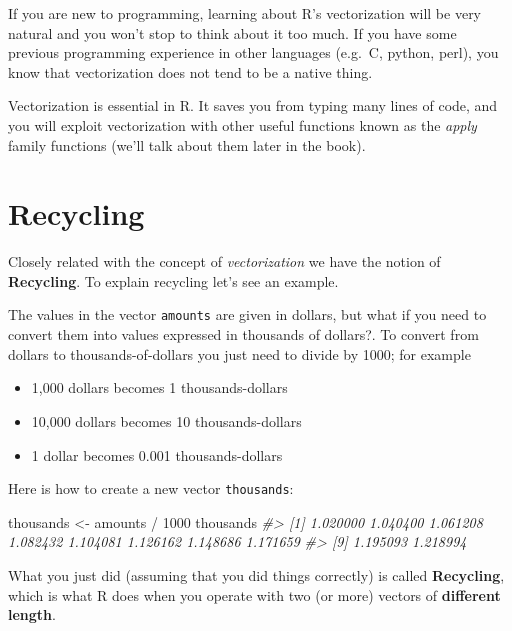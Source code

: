 \documentclass[
]{book}
\newenvironment{Shaded}{\begin{snugshade}}{\end{snugshade}}
\newcommand{\CommentTok}[1]{\textcolor[rgb]{0.56,0.35,0.01}{\textit{#1}}}
\newcommand{\DecValTok}[1]{\textcolor[rgb]{0.00,0.00,0.81}{#1}}
\newcommand{\NormalTok}[1]{#1}
\newcommand{\OtherTok}[1]{\textcolor[rgb]{0.56,0.35,0.01}{#1}}
\newcommand{\SpecialCharTok}[1]{\textcolor[rgb]{0.00,0.00,0.00}{#1}}
\providecommand{\tightlist}{%
  \setlength{\itemsep}{0pt}\setlength{\parskip}{0pt}}
\begin{document}
If you are new to programming, learning about R's vectorization will be very
natural and you won't stop to think about it too much. If you have some previous
programming experience in other languages (e.g.~C, python, perl), you know
that vectorization does not tend to be a native thing.

Vectorization is essential in R. It saves you from typing many lines of code,
and you will exploit vectorization with other useful functions known as the
\emph{apply} family functions (we'll talk about them later in the book).

\hypertarget{recycling}{%
\section{Recycling}\label{recycling}}

Closely related with the concept of \emph{vectorization} we have the notion of
\textbf{Recycling}. To explain recycling let's see an example.

The values in the vector \texttt{amounts} are given in dollars, but what if you need
to convert them into values expressed in thousands of dollars?. To convert
from dollars to thousands-of-dollars you just need to divide by 1000; for
example

\begin{itemize}
\tightlist
\item
  1,000 dollars becomes 1 thousands-dollars
\item
  10,000 dollars becomes 10 thousands-dollars
\item
  1 dollar becomes 0.001 thousands-dollars
\end{itemize}

Here is how to create a new vector \texttt{thousands}:

\begin{Shaded}
\begin{Highlighting}[]
\NormalTok{thousands }\OtherTok{\textless{}{-}}\NormalTok{ amounts }\SpecialCharTok{/} \DecValTok{1000}
\NormalTok{thousands}
\CommentTok{\#\textgreater{}  [1] 1.020000 1.040400 1.061208 1.082432 1.104081 1.126162 1.148686 1.171659}
\CommentTok{\#\textgreater{}  [9] 1.195093 1.218994}
\end{Highlighting}
\end{Shaded}

What you just did (assuming that you did things correctly) is called
\textbf{Recycling}, which is what R does when you operate with two (or more) vectors
of \textbf{different length}.
\end{document}
